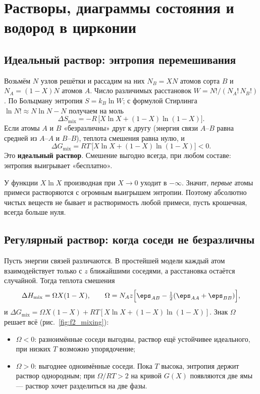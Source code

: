 \chapter{Растворы, диаграммы состояния и водород в цирконии}

\section{Идеальный раствор: энтропия перемешивания}

Возьмём $N$ узлов решётки и рассадим на них $N_B = XN$ атомов сорта $B$ и $N_A = (1-X)N$ атомов $A$. Число
различимых расстановок $W = N!/(N_A!\,N_B!)$. По Больцману энтропия $S = k_B\ln W$; с формулой Стирлинга
$\ln N! \approx N\ln N - N$ получаем на моль
\begin{equation}
\Delta S_{\text{mix}} = -R\,\bigl[X\ln X + (1-X)\ln(1-X)\bigr] .
\end{equation}
Если атомы $A$ и $B$ «безразличны» друг к другу (энергия связи $A$--$B$ равна средней из $A$--$A$ и $B$--$B$),
теплота смешения равна нулю, и
\begin{equation}
\Delta G_{\text{mix}} = RT\,\bigl[X\ln X + (1-X)\ln(1-X)\bigr] < 0 .
\end{equation}
Это \textbf{идеальный раствор}. Смешение выгодно всегда, при любом составе: энтропия выигрывает «бесплатно».

\begin{idea}
У функции $X\ln X$ производная при $X\to 0$ уходит в $-\infty$. Значит, \emph{первые} атомы примеси растворяются
с огромным выигрышем энтропии. Поэтому абсолютно чистых веществ не бывает и растворимость любой примеси, пусть
крошечная, всегда больше нуля.
\end{idea}

\section{Регулярный раствор: когда соседи не безразличны}

Пусть энергии связей различаются. В простейшей модели каждый атом взаимодействует только с $z$ ближайшими
соседями, а расстановка остаётся случайной. Тогда теплота смешения
\begin{equation}
\Delta H_{\text{mix}} = \Omega X(1-X),\qquad
\Omega = N_A z\Bigl[\eps_{AB} - \tfrac12(\eps_{AA}+\eps_{BB})\Bigr],
\end{equation}
и $\Delta G_{\text{mix}} = \Omega X(1-X) + RT[X\ln X + (1-X)\ln(1-X)]$. Знак $\Omega$ решает всё
(рис.~\ref{fig:f2_mixing}):
\begin{itemize}
\item $\Omega < 0$: разноимённые соседи выгодны, раствор ещё устойчивее идеального, при низких $T$ возможно упорядочение;
\item $\Omega > 0$: выгоднее одноимённые соседи. Пока $T$ высока, энтропия держит раствор однородным; при
  $\Omega/RT > 2$ на кривой $G(X)$ появляются две ямы --- раствор хочет разделиться на две фазы.
\end{itemize}

